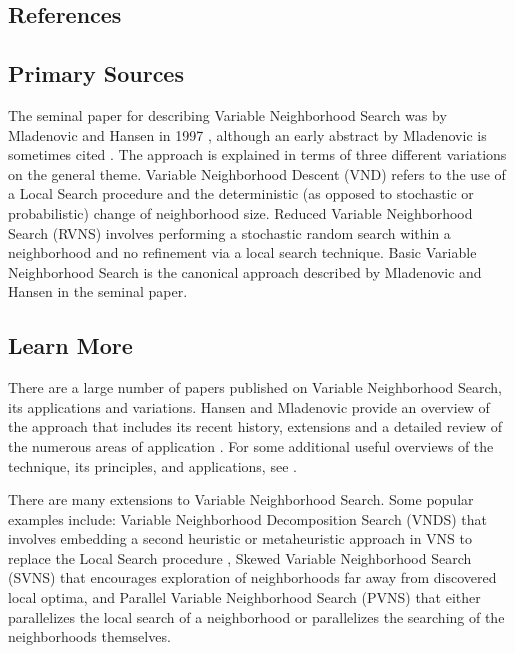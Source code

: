\subsection{References}

% 
% 
\subsection{Primary Sources}
The seminal paper for describing Variable Neighborhood Search was by Mladenovic and Hansen in 1997 \cite{Mladenovic1997}, although an early abstract by Mladenovic is sometimes cited \cite{Mladenovic1995}.
The approach is explained in terms of three different variations on the general theme. Variable Neighborhood Descent (VND) refers to the use of a Local Search procedure and the deterministic (as opposed to stochastic or probabilistic) change of neighborhood size. Reduced Variable Neighborhood Search (RVNS) involves performing a stochastic random search within a neighborhood and no refinement via a local search technique. Basic Variable Neighborhood Search is the canonical approach described by Mladenovic and Hansen in the seminal paper.

% 
% 
\subsection{Learn More}
There are a large number of papers published on Variable Neighborhood Search, its applications and variations.
Hansen and Mladenovic provide an overview of the approach that includes its recent history, extensions and a detailed review of the numerous areas of application \cite{Hansen2003}. 
For some additional useful overviews of the technique, its principles, and applications, see \cite{Hansen1998, Hansen2001a, Hansen2002}.

There are many extensions to Variable Neighborhood Search. Some popular examples include: Variable Neighborhood Decomposition Search (VNDS) that involves embedding a second heuristic or metaheuristic approach in VNS to replace the Local Search procedure \cite{Hansen2001}, Skewed Variable Neighborhood Search (SVNS) that encourages exploration of neighborhoods far away from discovered local optima, and Parallel Variable Neighborhood Search (PVNS) that either parallelizes the local search of a neighborhood or parallelizes the searching of the neighborhoods themselves.


